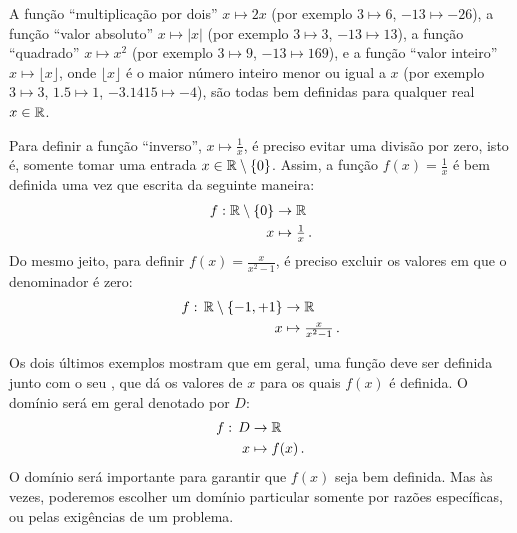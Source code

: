 \begin{ex}
 A função ``multiplicação por dois'' $x\mapsto 2x$ (por exemplo $3\mapsto 6$, $-13\mapsto
-26$),
 a função ``valor absoluto'' $x\mapsto |x|$ (por exemplo $3\mapsto 3$, $-13 \mapsto 13$),
a função ``quadrado'' $x\mapsto x^2$ (por exemplo $3\mapsto 9$, $-13\mapsto 169$), e a
função ``valor inteiro'' $x\mapsto \lfloor x\rfloor$, onde $\lfloor x\rfloor$ é o maior
número inteiro menor ou igual a $x$ (por exemplo $3\mapsto 3$, $1.5\mapsto 1$,
$-3.1415\mapsto -4$), são todas bem definidas para qualquer real $x\in \mathbb{R}$.
\end{ex}

\begin{ex}\label{Ex:Umsobrex}
Para definir a função ``inverso'', $x\mapsto \frac{1}{x}$, é
preciso evitar uma divisão por zero, isto é, somente tomar uma entrada $x\in \mathbb{R}\setminus
\{0\}$. 
Assim, a função $f(x)=\tfrac{1}{x}$ é bem definida uma vez que escrita da seguinte maneira:
\begin{align*}
 f:\mathbb{R}\setminus \{0\}&\to \mathbb{R}\\
x&\mapsto \tfrac{1}{x}\,.
\end{align*}
Do mesmo jeito, para definir $f(x)=\tfrac{x}{x^2-1}$, é preciso excluir os valores em que
o denominador é zero:
\begin{align*}
 f:\,\mathbb{R}\setminus\{-1,+1\}&\to \mathbb{R}\\
x&\mapsto \tfrac{x}{x^2-1}\,.
\end{align*}
\end{ex}

Os dois últimos exemplos mostram que em geral, uma função deve ser definida {junto} com o
seu , que dá os valores de $x$ para os quais $f(x)$ é
definida. O domínio será em geral denotado por $D$:
\begin{align*}
f:\,D&\to \mathbb{R}\\
x&\mapsto f(x)\,.
\end{align*}
O domínio será importante para garantir que $f(x)$ seja bem definida. Mas às
vezes, poderemos escolher um domínio particular somente por razões específicas, ou pelas
exigências de um problema.

